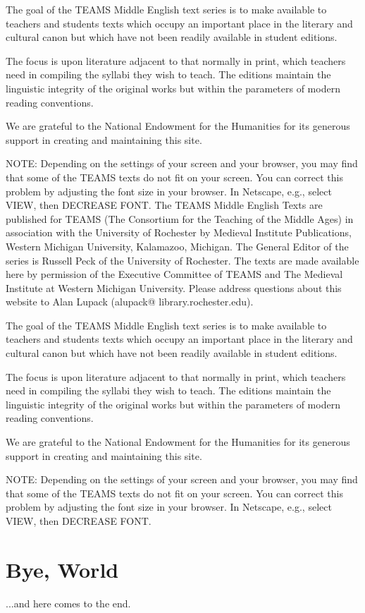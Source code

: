 The goal of the TEAMS Middle English text series is to make available to teachers and students texts which occupy an important place in the literary and cultural canon but which have not been readily available in student editions.

The focus is upon literature adjacent to that normally in print, which teachers need in compiling the syllabi they wish to teach. The editions maintain the linguistic integrity of the original works but within the parameters of modern reading conventions.

We are grateful to the National Endowment for the Humanities for its generous support in creating and maintaining this site.

NOTE: Depending on the settings of your screen and your browser, you may find that some of the TEAMS texts do not fit on your screen. You can correct this problem by adjusting the font size in your browser. In Netscape, e.g., select VIEW, then DECREASE FONT.
The TEAMS Middle English Texts are published for TEAMS (The Consortium for the Teaching of the Middle Ages) in association with the University of Rochester by Medieval Institute Publications, Western Michigan University, Kalamazoo, Michigan. The General Editor of the series is Russell Peck of the University of Rochester. The texts are made available here by permission of the Executive Committee of TEAMS and The Medieval Institute at Western Michigan University. Please address questions about this website to Alan Lupack (alupack@ library.rochester.edu).

The goal of the TEAMS Middle English text series is to make available to teachers and students texts which occupy an important place in the literary and cultural canon but which have not been readily available in student editions.

The focus is upon literature adjacent to that normally in print, which teachers need in compiling the syllabi they wish to teach. The editions maintain the linguistic integrity of the original works but within the parameters of modern reading conventions.

We are grateful to the National Endowment for the Humanities for its generous support in creating and maintaining this site.

NOTE: Depending on the settings of your screen and your browser, you may find that some of the TEAMS texts do not fit on your screen. You can correct this problem by adjusting the font size in your browser. In Netscape, e.g., select VIEW, then DECREASE FONT.
\chapter{Bye, World}
...and here comes to the end.

\appendix

